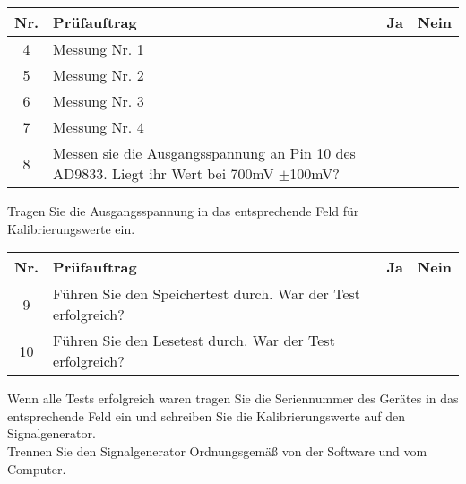 \begin{flushleft}
	\begin{tabular}{|c||p{10cm}|c|c|}
		\hline
		Nr. & Prüfauftrag & Ja & Nein\\
		\hline
		4 & Messung Nr. 1 & & \\
		\hline
		5 & Messung Nr. 2 & & \\
		\hline
		6 & Messung Nr. 3 & & \\
		\hline
		7 & Messung Nr. 4 & & \\
		\hline
		8 & Messen sie die Ausgangsspannung an Pin 10 des AD9833. Liegt ihr Wert bei 700mV $\pm$100mV? & & \\
		\hline
	\end{tabular}
\end{flushleft}
Tragen Sie die Ausgangsspannung in das entsprechende Feld für Kalibrierungswerte ein.\\
\begin{flushleft}
	\begin{tabular}{|c||p{10cm}|c|c|}
		\hline
		Nr. & Prüfauftrag & Ja & Nein\\
		\hline
		9 & Führen Sie den Speichertest durch. War der Test erfolgreich? & & \\
		\hline
		10 & Führen Sie den Lesetest durch. War der Test erfolgreich? & & \\
		\hline
	\end{tabular}
\end{flushleft}
Wenn alle Tests erfolgreich waren tragen Sie die Seriennummer des Gerätes in das entsprechende Feld ein und schreiben Sie die Kalibrierungswerte auf den Signalgenerator.\\
Trennen Sie den Signalgenerator Ordnungsgemäß von der Software und vom Computer.
